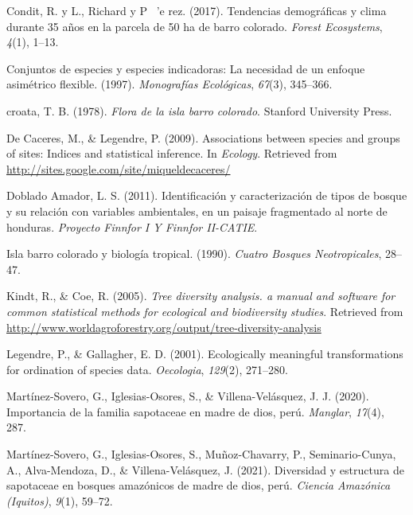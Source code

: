 \documentclass[11pt,]{article}
\begin{document}
\hypertarget{ref-condit2017demographic}{}
Condit, R. y L., Richard y P ~'e rez. (2017). Tendencias demográficas y
clima durante 35 años en la parcela de 50 ha de barro colorado.
\emph{Forest Ecosystems}, \emph{4}(1), 1--13.

\hypertarget{ref-dufrene1997species}{}
Conjuntos de especies y especies indicadoras: La necesidad de un enfoque
asimétrico flexible. (1997). \emph{Monografías Ecológicas},
\emph{67}(3), 345--366.

\hypertarget{ref-croat1978flora}{}
croata, T. B. (1978). \emph{Flora de la isla barro colorado}. Stanford
University Press.

\hypertarget{ref-indicspecies}{}
De Caceres, M., \& Legendre, P. (2009). Associations between species and
groups of sites: Indices and statistical inference. In \emph{Ecology}.
Retrieved from \url{http://sites.google.com/site/miqueldecaceres/}

\hypertarget{ref-doblado2011identificacion}{}
Doblado Amador, L. S. (2011). Identificación y caracterización de tipos
de bosque y su relación con variables ambientales, en un paisaje
fragmentado al norte de honduras. \emph{Proyecto Finnfor I Y Finnfor
II-CATIE}.

\hypertarget{ref-leigh1990barro}{}
Isla barro colorado y biología tropical. (1990). \emph{Cuatro Bosques
Neotropicales}, 28--47.

\hypertarget{ref-diversityanalysis}{}
Kindt, R., \& Coe, R. (2005). \emph{Tree diversity analysis. a manual
and software for common statistical methods for ecological and
biodiversity studies}. Retrieved from
\url{http://www.worldagroforestry.org/output/tree-diversity-analysis}

\hypertarget{ref-legendre2001ecologically}{}
Legendre, P., \& Gallagher, E. D. (2001). Ecologically meaningful
transformations for ordination of species data. \emph{Oecologia},
\emph{129}(2), 271--280.

\hypertarget{ref-martinez2020importancia}{}
Martínez-Sovero, G., Iglesias-Osores, S., \& Villena-Velásquez, J. J.
(2020). Importancia de la familia sapotaceae en madre de dios, perú.
\emph{Manglar}, \emph{17}(4), 287.

\hypertarget{ref-martinez2021diversidad}{}
Martínez-Sovero, G., Iglesias-Osores, S., Muñoz-Chavarry, P.,
Seminario-Cunya, A., Alva-Mendoza, D., \& Villena-Velásquez, J. (2021).
Diversidad y estructura de sapotaceae en bosques amazónicos de madre de
dios, perú. \emph{Ciencia Amazónica (Iquitos)}, \emph{9}(1), 59--72.
\end{document}
